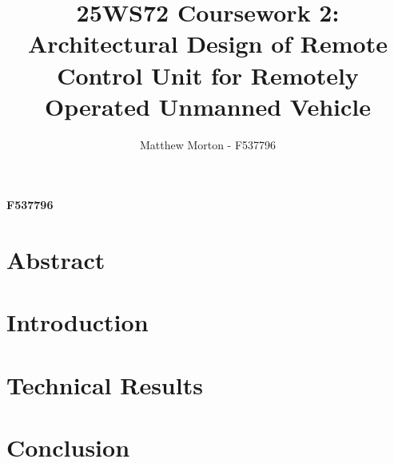 \documentclass[11pt]{article}
\title{25WS72 Coursework 2: Architectural Design of Remote Control Unit for Remotely Operated Unmanned Vehicle}
\author{Matthew Morton - F537796}
\begin{document}
\begin{center}
    \textbf{}

    \textbf{}

    \textbf{F537796}
\end{center}

\linespread{1.15}

\section*{Abstract}

\hrulefill

\tableofcontents

\hrulefill

\clearpage

\section{Introduction}



\clearpage

\section{Technical Results}



\clearpage

\section{Conclusion}



\clearpage

\printbibliography[heading=bibintoc, title=References]{}
\end{document}
